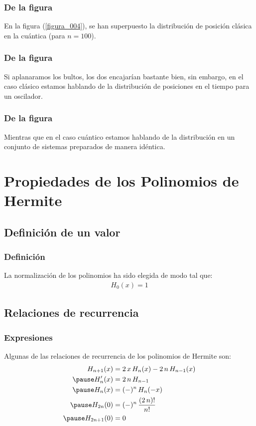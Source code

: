 \documentclass[12pt]{beamer}
\begin{document}
\begin{frame}
\frametitle{De la figura}
En la figura (\ref{figura_004}), se han superpuesto la distribución de posición clásica en la cuántica (para $n = 100$).
\end{frame}
\begin{frame}
\frametitle{De la figura}
Si aplanaramos los bultos, los dos encajarían bastante bien, \pause sin embargo, en el caso clásico estamos hablando de la distribución de posiciones en el tiempo para un oscilador.
\end{frame}
\begin{frame}
\frametitle{De la figura}
Mientras que en el caso cuántico estamos hablando de la distribución en un conjunto de sistemas preparados de manera idéntica.
\end{frame}


\section{Propiedades de los Polinomios de Hermite}
\subsection{Definición de un valor}

\begin{frame}
\frametitle{Definición}
La normalización de los polinomios ha sido elegida de modo tal que:
\pause
\begin{align*}
H_{0} (x) = 1
\end{align*}
\end{frame}

\subsection{Relaciones de recurrencia}

\begin{frame}
\frametitle{Expresiones}
Algunas de las relaciones de recurrencia de los polinomios de Hermite son:
\pause
\begin{eqnarray*}
\begin{aligned}
H_{n+1} (x) &= 2 \, x \, H_{n} (x) - 2 \, n \, H_{n-1} (x) \\ \pause
\pderivada{H}_{n} (x) &= 2 \, n \, H_{n-1} \\ \pause
H_{n} (x) &= (-)^{n} \, H_{n} (-x) \\ \pause
H_{2n} (0) &= (-)^{n} \, \dfrac{(2 \, n)!}{n!} \\ \pause
H_{2n+1} (0) &= 0
\end{aligned}
\end{eqnarray*}
\end{frame}
\end{document}
